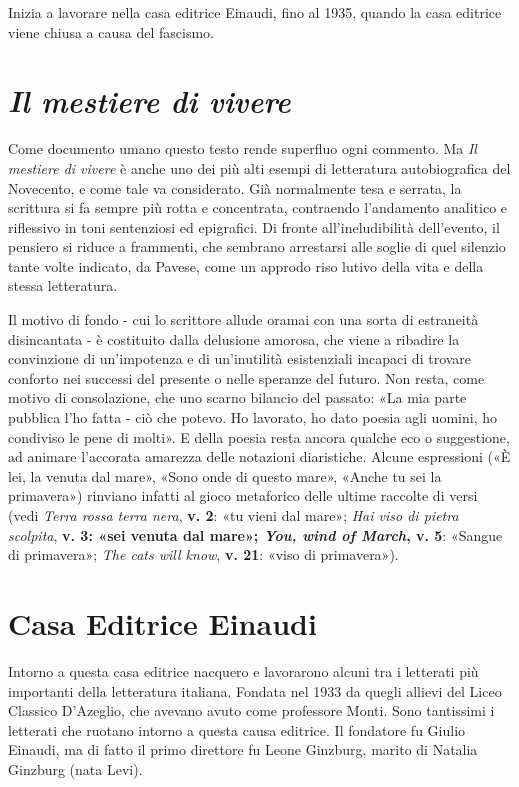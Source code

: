 Inizia a lavorare nella casa editrice Einaudi, fino al 1935, quando la casa editrice viene chiusa a causa del fascismo.

\section{\textit{Il mestiere di vivere}}

Come documento umano questo testo rende superfluo ogni commento. Ma \textit{Il mestiere di vivere} è anche uno dei più alti esempi di letteratura autobiografica del Novecento, e come tale va considerato. Già normalmente tesa e serrata, la scrittura si fa sempre più rotta e concentrata, contraendo l'andamento analitico e riflessivo in toni sentenziosi ed epigrafici. Di fronte all'ineludibilità dell'evento, il pensiero si riduce a frammenti, che sembrano arrestarsi alle soglie di quel silenzio tante volte indicato, da Pavese, come un approdo riso lutivo della vita e della stessa letteratura.

Il motivo di fondo - cui lo scrittore allude oramai con una sorta di estraneità disincantata - è costituito dalla delusione amorosa, che viene a ribadire la convinzione di un'impotenza e di un'inutilità esistenziali incapaci di trovare conforto nei successi del presente o nelle speranze del futuro. Non resta, come motivo di consolazione, che uno scarno bilancio del passato: «La mia parte pubblica l'ho fatta - ciò che potevo. Ho lavorato, ho dato poesia agli uomini, ho condiviso le pene di molti». E della poesia resta ancora qualche eco o suggestione, ad animare l'accorata amarezza delle notazioni diaristiche. Alcune espressioni («È lei, la venuta dal mare», «Sono onde di questo mare», «Anche tu sei la primavera») rinviano infatti al gioco metaforico delle ultime raccolte di versi (vedi \textit{Terra rossa terra nera}, \textbf{v. 2}: «tu vieni dal mare»; \textit{Hai viso di pietra scolpita}, \textbf{v. 3\textbf{: «sei venuta dal mare»; \textit{You, wind of March}, }v. 5}: «Sangue di primavera»; \textit{The cats will know}, \textbf{v. 21}: «viso di primavera»).

\section{Casa Editrice Einaudi}

Intorno a questa casa editrice nacquero e lavorarono alcuni tra i letterati più importanti della letteratura italiana. Fondata nel 1933 da quegli allievi del Liceo Classico D'Azeglio, che avevano avuto come professore Monti.
Sono tantissimi i letterati che ruotano intorno a questa causa editrice. Il fondatore fu Giulio Einaudi, ma di fatto il primo direttore fu Leone Ginzburg, marito di Natalia Ginzburg (nata Levi).

